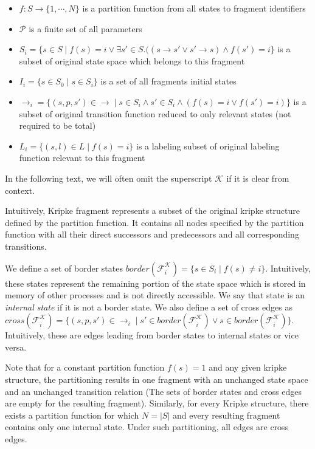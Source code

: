 \documentclass[12pt,oneside,draft]{fithesis2}
\newcommand{\ks}[1][]{\ensuremath{\mathcal{K}_{#1}}}
\newcommand{\kf}[2]{\ensuremath{\mathcal{F}^{#2}_{#1}}}
\newcommand{\trans}[1]{\stackrel{#1}{\rightarrow}}
\newcommand{\params}{\mathcal{P}}
\begin{document}
			\begin{itemize}
				\item $f : S \rightarrow \{1, \cdots , N \}$ is a partition function from all states to fragment identifiers
				\item $\params$ is a finite set of all parameters
				\item $S_{i} = \{ s \in S \mid f(s) = i \vee \exists s'\in S. ((s \trans{} s' \vee s' \trans{} s) \wedge f(s') = i \}$ is a subset of original state space which belongs to this fragment
				\item $I_{i} = \{ s \in S_0 \mid s \in S_{i} \} $ is a set of all fragments initial states
				\item $\trans{}_{i} = \{ (s, p, s') \in \trans{} \mid s \in S_{i} \wedge s' \in S_{i} \wedge (f(s) = i \vee f(s') = i) \}$ is a subset of original transition function reduced to only relevant states (not required to be total)
				\item $L_{i} = \{ (s, l) \in L \mid f(s) = i \}$ is a labeling subset of original labeling function relevant to this fragment
			\end{itemize}
						
			In the following text, we will often omit the superscript $\ks$ if it is clear from context.
			
			Intuitively, Kripke fragment represents a subset of the original kripke structure defined by the partition function. It contains all nodes specified by the partition function with all their direct successors and predecessors and all corresponding transitions. 			
			
			We define a set of border states $border(\kf{i}{\ks}) = \{ s \in S_{i} \mid f(s) \neq i \}$. Intuitively, these states represent the remaining portion of the state space which is stored in memory of other processes and is not directly accessible. We say that state is an \emph{internal state} if it is not a border state. We also define a set of cross edges as $cross(\kf{i}{\ks}) = \{ (s, p, s') \in \trans{}_{i} \mid s' \in border(\kf{i}{\ks}) \vee s \in border(\kf{i}{\ks}) \}$. Intuitively, these are edges leading from border states to internal states or vice versa. 
			
			Note that for a constant partition function $f(s) = 1$ and any given kripke structure, the partitioning results in one fragment with an unchanged state space and an unchanged transition relation (The sets of border states and cross edges are empty for the resulting fragment). Similarly, for every Kripke structure, there exists a partition function for which $N = |S|$ and every resulting fragment contains only one internal state. Under such partitioning, all edges are cross edges. 
			
\end{document}
